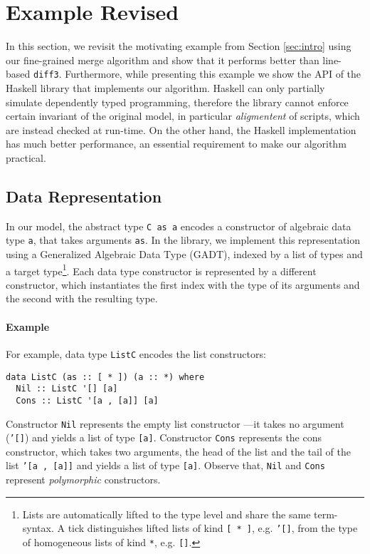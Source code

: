 \documentclass{sigplanconf}
\theoremstyle{plain}
\begin{document}
\section{Example Revised}
\label{sec:haskell}
In this section, we revisit the motivating example from Section
\ref{sec:intro} using our fine-grained merge algorithm and show that
it performs better than line-based \texttt{diff3}.
%
Furthermore, while presenting this example we show the API of the
Haskell library that implements our algorithm.
%
Haskell can only partially simulate dependently typed programming,
therefore the library cannot enforce certain invariant of the
original model, in particular \emph{aligmentent} of scripts, which are
instead checked at run-time.
%
On the other hand, the Haskell implementation has much better
performance, an essential requirement to make our algorithm practical.
%

\subsection{Data  Representation}
In our model, the abstract type \texttt{C as a} encodes a constructor
of algebraic data type \texttt{a}, that takes arguments \texttt{as}.
%
In the library, we implement this representation using
a Generalized Algebraic Data Type (GADT), indexed by a list of types
and a target type\footnote{Lists are automatically lifted to the type
  level and share the same term-syntax. A tick distinguishes lifted
  lists of kind \texttt{[ * ]}, e.g. \texttt{'[]}, from the type of
  homogeneous lists of kind \texttt{*}, e.g. \texttt{[]}.}.
%
Each data type constructor is represented by a different constructor,
which instantiates the first index with the type of its arguments and
the second with the resulting type.
%
\paragraph{Example}
For example, data type \texttt{ListC} encodes the list constructors:
\begin{verbatim}
data ListC (as :: [ * ]) (a :: *) where
  Nil :: ListC '[] [a]
  Cons :: ListC '[a , [a]] [a]
\end{verbatim}
Constructor \texttt{Nil} represents the empty list constructor ---it
takes no argument (\texttt{'[]}) and yields a list of type
\texttt{[a]}.
Constructor \texttt{Cons} represents the cons constructor, which
takes two arguments, the head of the list and the tail of the list
\texttt{'[a , [a]]} and yields a list of type \texttt{[a]}.
%
Observe that, \texttt{Nil} and \texttt{Cons} represent \emph{polymorphic}
constructors.
%
\end{document}
